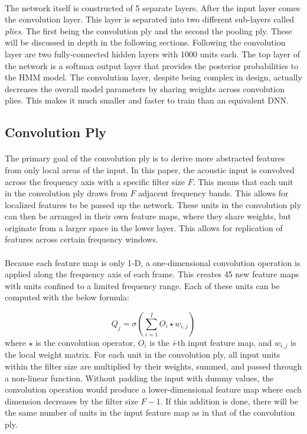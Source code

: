 \documentclass[letterpaper]{article}
\begin{document}
\paragraph{} The network itself is constructed of 5 separate layers. After the input layer comes the convolution layer. This layer is separated into two different sub-layers called \textit{plies}. The first being the convolution ply and the second the pooling ply. These will be discussed in depth in the following sections. Following the convolution layer are two fully-connected hidden layers with 1000 units each. The top layer of the network is a softmax output layer that provides the posterior probabilities to the HMM model. The convolution layer, despite being complex in design, actually decreases the overall model parameters by sharing weights across convolution plies. This makes it much smaller and faster to train than an equivalent DNN.

\subsection*{Convolution Ply}

\paragraph{} The primary goal of the convolution ply is to derive more abstracted features from only local areas of the input. In this paper, the acoustic input is convolved across the frequency axis with a specific filter size $F$. This means that each unit in the convolution ply draws from $F$ adjacent frequency bands. This allows for localized features to be passed up the network. These units in the convolution ply can then be arranged in their own feature maps, where they share weights, but originate from a larger space in the lower layer. This allows for replication of features across certain frequency windows.

\paragraph{} Because each feature map is only 1-D, a one-dimensional convolution operation is applied along the frequency axis of each frame. This creates 45 new feature maps with units confined to a limited frequency range. Each of these units can be computed with the below formula:

\begin{equation*}
	Q_{j} = \sigma (\sum_{i=1}^{I}O_{i}\star w_{i,j})
\end{equation*}
where $\star$ is the convolution operator, $O_{i}$ is the \textit{i}-th input feature map, and $w_{i,j}$ is the local weight matrix. For each unit in the convolution ply, all input units within the filter size are multiplied by their weights, summed, and passed through a non-linear function. Without padding the input with dummy values, the convolution operation would produce a lower-dimensional feature map where each dimension decreases by the filter size $F-1$. If this addition is done, there will be the same number of units in the input feature map as in that of the convolution ply.
\end{document}
